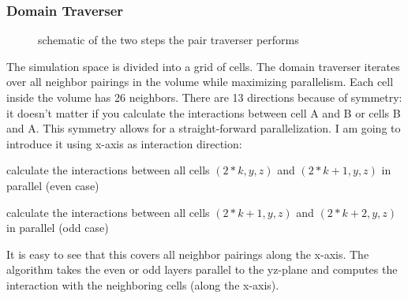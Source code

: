\subsubsection{Domain Traverser}
\begin{figure}
  \centering
  \caption{schematic of the two steps the pair traverser performs}
\end{figure}
The simulation space is divided into a grid of cells. The domain traverser iterates over all neighbor pairings in the volume while maximizing parallelism. Each cell inside the volume has 26 neighbors. There are 13 directions because of symmetry: it doesn't matter if you calculate the interactions between cell A and B or cells B and A. This symmetry allows for a straight-forward parallelization.
I am going to introduce it using x-axis as interaction direction:
\begin{compactenum}
\item calculate the interactions between all cells $ \left ( 2*k, y, z \right ) $ and $ \left ( 2*k + 1, y, z \right ) $ in parallel (even case)
\item calculate the interactions between all cells $ \left ( 2*k + 1, y, z \right ) $ and $ \left ( 2*k + 2, y, z \right ) $ in parallel (odd case)
\end{compactenum}
It is easy to see that this covers all neighbor pairings along the x-axis.
The algorithm takes the even or odd layers parallel to the yz-plane and computes the interaction with the neighboring cells (along the x-axis).

